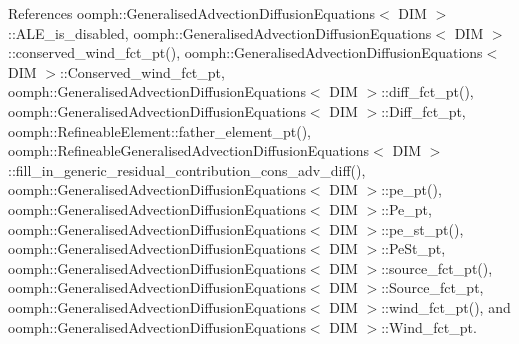 References oomph\+::\+Generalised\+Advection\+Diffusion\+Equations$<$ D\+I\+M $>$\+::\+A\+L\+E\+\_\+is\+\_\+disabled, oomph\+::\+Generalised\+Advection\+Diffusion\+Equations$<$ D\+I\+M $>$\+::conserved\+\_\+wind\+\_\+fct\+\_\+pt(), oomph\+::\+Generalised\+Advection\+Diffusion\+Equations$<$ D\+I\+M $>$\+::\+Conserved\+\_\+wind\+\_\+fct\+\_\+pt, oomph\+::\+Generalised\+Advection\+Diffusion\+Equations$<$ D\+I\+M $>$\+::diff\+\_\+fct\+\_\+pt(), oomph\+::\+Generalised\+Advection\+Diffusion\+Equations$<$ D\+I\+M $>$\+::\+Diff\+\_\+fct\+\_\+pt, oomph\+::\+Refineable\+Element\+::father\+\_\+element\+\_\+pt(), oomph\+::\+Refineable\+Generalised\+Advection\+Diffusion\+Equations$<$ D\+I\+M $>$\+::fill\+\_\+in\+\_\+generic\+\_\+residual\+\_\+contribution\+\_\+cons\+\_\+adv\+\_\+diff(), oomph\+::\+Generalised\+Advection\+Diffusion\+Equations$<$ D\+I\+M $>$\+::pe\+\_\+pt(), oomph\+::\+Generalised\+Advection\+Diffusion\+Equations$<$ D\+I\+M $>$\+::\+Pe\+\_\+pt, oomph\+::\+Generalised\+Advection\+Diffusion\+Equations$<$ D\+I\+M $>$\+::pe\+\_\+st\+\_\+pt(), oomph\+::\+Generalised\+Advection\+Diffusion\+Equations$<$ D\+I\+M $>$\+::\+Pe\+St\+\_\+pt, oomph\+::\+Generalised\+Advection\+Diffusion\+Equations$<$ D\+I\+M $>$\+::source\+\_\+fct\+\_\+pt(), oomph\+::\+Generalised\+Advection\+Diffusion\+Equations$<$ D\+I\+M $>$\+::\+Source\+\_\+fct\+\_\+pt, oomph\+::\+Generalised\+Advection\+Diffusion\+Equations$<$ D\+I\+M $>$\+::wind\+\_\+fct\+\_\+pt(), and oomph\+::\+Generalised\+Advection\+Diffusion\+Equations$<$ D\+I\+M $>$\+::\+Wind\+\_\+fct\+\_\+pt.

\mbox{\label{classoomph_1_1RefineableGeneralisedAdvectionDiffusionEquations_af995cd64e5a189ebfd0565ac931abe1f}} 
